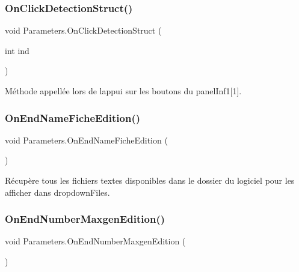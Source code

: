 \mbox{\label{class_parameters_ad62219d943618c3b970a46239ae443ae}} 
\subsubsection{\texorpdfstring{On\+Click\+Detection\+Struct()}{OnClickDetectionStruct()}}
{\footnotesize\ttfamily void Parameters.\+On\+Click\+Detection\+Struct (\begin{DoxyParamCaption}\item[{int}]{ind }\end{DoxyParamCaption})\hspace{0.3cm}{\ttfamily [inline]}}



Méthode appellée lors de l\textquotesingle{}appui sur les boutons du panel\+Inf1\mbox{[}1\mbox{]}. 

\mbox{\label{class_parameters_ad3db64cd1a228cb925a9afd7f32332a5}} 
\subsubsection{\texorpdfstring{On\+End\+Name\+Fiche\+Edition()}{OnEndNameFicheEdition()}}
{\footnotesize\ttfamily void Parameters.\+On\+End\+Name\+Fiche\+Edition (\begin{DoxyParamCaption}{ }\end{DoxyParamCaption})\hspace{0.3cm}{\ttfamily [inline]}}



Récupère tous les fichiers textes disponibles dans le dossier du logiciel pour les afficher dans dropdown\+Files. 

\mbox{\label{class_parameters_a4167680889821ca1d2f3bc487b0bebae}} 
\subsubsection{\texorpdfstring{On\+End\+Number\+Maxgen\+Edition()}{OnEndNumberMaxgenEdition()}}
{\footnotesize\ttfamily void Parameters.\+On\+End\+Number\+Maxgen\+Edition (\begin{DoxyParamCaption}{ }\end{DoxyParamCaption})\hspace{0.3cm}{\ttfamily [inline]}}



